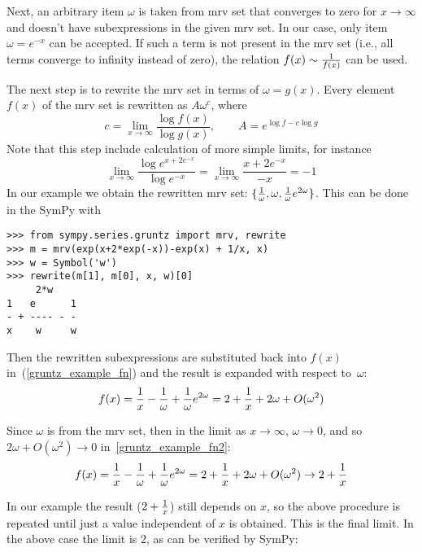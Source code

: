 Next, an arbitrary item $\omega$ is taken from mrv set that converges to zero for
$x\to\infty$ and doesn't have subexpressions in the given mrv set.  In our case,
only item $\omega=e^{-x}$ can be accepted.  If such a term is not
present in the mrv set (i.e., all terms converge to infinity instead of zero),
the relation $f(x)\sim {1\over f(x)}$ can be used.

The next step is to rewrite the mrv set in terms of $\omega=g(x)$.  Every element
$f(x)$ of the mrv set is rewritten as $A \omega^c$, where
\begin{equation}
\label{gruntz_rewrite}
c = \lim\limits_{x\to\infty} \frac{\log{f(x)}}{\log{g(x)}},
\qquad
A = e^{\log f - c \log g}
\end{equation}
Note that this step include calculation of more simple limits, for instance
\begin{equation}
	\lim\limits_{x\to\infty} \frac{\log{e^{x + 2 e^{-x}}}}{\log e^{-x}}=
	\lim\limits_{x\to\infty} \frac{x + 2 e^{-x}}{-x} = -1
\end{equation}
In our example we obtain the rewritten mrv set: $\{{1\over\omega},
\omega, {1\over\omega}e^{2\omega}\}$. This can be done in the SymPy with
\begin{verbatim}
>>> from sympy.series.gruntz import mrv, rewrite
>>> m = mrv(exp(x+2*exp(-x))-exp(x) + 1/x, x)
>>> w = Symbol('w')
>>> rewrite(m[1], m[0], x, w)[0]
     2*w
1   e      1
- + ---- - -
x    w     w
\end{verbatim}
Then the rewritten subexpressions are
substituted back into $f(x)$ in~(\ref{gruntz_example_fn})
and the result is expanded with respect to~$\omega$:
\begin{equation}
    \label{gruntz_example_fn2}
f(x) = {1\over x}-{1\over\omega}+{1\over\omega}e^{2\omega}
     = 2+{1\over x} + 2\omega + O(\omega^2)
\end{equation}

Since $\omega$ is from the mrv set, then in the limit as $x\to\infty$,
$\omega\to0$, and so $2\omega + O(\omega^2) \to 0$ in~\eqref{gruntz_example_fn2}:
\begin{equation}
f(x) = {1\over x}-{1\over\omega}+{1\over\omega}e^{2\omega}
    = 2+{1\over x} + 2\omega + O(\omega^2)
    \to 2 + {1\over x}
\end{equation}

In our example the result ($2+{1\over x}$) still depends on $x$, so the above procedure is
repeated until just a value independent of $x$ is obtained. This is the final
limit. In the above case the limit is $2$, as can be
verified by SymPy:

